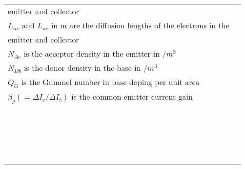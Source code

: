 \documentclass[10pt,landscape]{article}
\begin{document}
\begin{multicols}{3}
\begin{tabular}{@{}ll@{}}
emitter and collector  \\
$ L_{ne}$ and $L_{nc}$ in m are the diffusion lengths of the electrons in the \\
emitter and collector \\
$ N_{Ae}$ is the acceptor density in the emitter in $/m^3$ \\
$ N_{Db}$ is the donor density in the base in $/m^3$ \\
$ Q_G$ is the Gummel number in base doping per unit area \\
$ \beta_g (=\Delta I_c/\Delta I_b)$ is the common-emitter current gain \\
$ $ \\
$ $ \\
$ $ \\
$ $ \\
$ $ \\
$ $ \\
$ $ \\
$ $ \\
$ $ \\
$ $ \\
$ $ \\
$ $ \\
$ $ \\
$ $ \\
$ $ \\
$ $ \\
$ $ \\
$ $ \\
$ $ \\
$ $ \\
\end{tabular}


\end{multicols}
\end{document}
